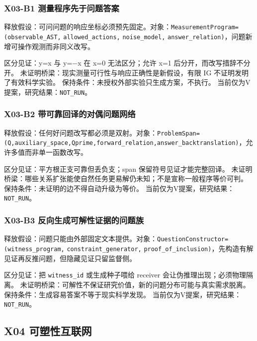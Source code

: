 \documentclass[
  10pt,
]{article}
\begin{document}
\subsubsection{X03-B1
测量程序先于问题答案}\label{x03-b1-ux6d4bux91cfux7a0bux5e8fux5148ux4e8eux95eeux9898ux7b54ux6848}

释放假设：可问问题的响应坐标必须预先固定。对象：\nolinkurl{MeasurementProgram=(observable_AST,}
\nolinkurl{allowed_actions,} \nolinkurl{noise_model,}
\nolinkurl{answer_relation)}，问题新增可操作观测而非同义改写。

区分见证：y=x 与 y=−x 在 x=0 无法区分；允许 x=1
后分开，而改写措辞不分开。
未证明桥梁：现实测量可行性与响应正确性是新假设，有限 IG
不证明发明了有效科学实验。 保持条件：未授权外部实验只生成方案，不执行。
当前仅为V提案，研究结果：\nolinkurl{NOT_RUN}。

\subsubsection{X03-B2
带可靠回译的对偶问题网络}\label{x03-b2-ux5e26ux53efux9760ux56deux8bd1ux7684ux5bf9ux5076ux95eeux9898ux7f51ux7edc}

释放假设：任何好问题改写都必须是双射。对象：\nolinkurl{ProblemSpan=(Q,auxiliary_space,Qprime,forward_relation,answer_backtranslation)}，允许多值而非单一函数改写。

区分见证：平方根正支可靠但丢负支；span 保留符号见证才能完整回译。
未证明桥梁：哪些关系扩张能使自然任务更易解仍未知；不是宣称一般程序等价可判。
保持条件：未证明的边不得自动升级为等价。
当前仅为V提案，研究结果：\nolinkurl{NOT_RUN}。

\subsubsection{X03-B3
反向生成可解性证据的问题族}\label{x03-b3-ux53cdux5411ux751fux6210ux53efux89e3ux6027ux8bc1ux636eux7684ux95eeux9898ux65cf}

释放假设：问题只能由外部固定文本提供。对象：\nolinkurl{QuestionConstructor=(witness_program,}
\nolinkurl{constraint_generator,}
\nolinkurl{proof_of_inclusion)}，先构造有解见证再反推问题，但隐藏见证只留监督侧。

区分见证：把 \nolinkurl{witness_id} 或生成种子喂给 receiver
会让伪推理出现；必须物理隔离。
未证明桥梁：可解性不保证研究价值，新的问题分布可能与真实需求脱离。
保持条件：生成容易答案不等于现实科学发现。
当前仅为V提案，研究结果：\nolinkurl{NOT_RUN}。

\subsection{X04
可塑性互联网}\label{x04-ux53efux5851ux6027ux4e92ux8054ux7f51}
\end{document}

